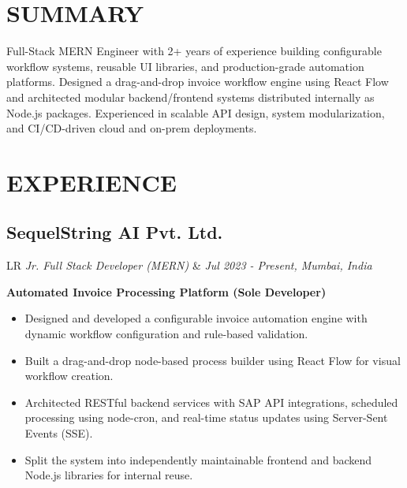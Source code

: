 \documentclass[10pt,a4paper]{moderncv}
\newcommand*{\experienceentry}[4]{
    \subsection{#1}
    \begin{tabularx}{\textwidth}{LR}
        {\itshape #2} & {\itshape #3, #4}
    \end{tabularx}
    \vspace{0.5mm}
}
\begin{document}
\maketitle



\section{SUMMARY}
Full-Stack MERN Engineer with 2+ years of experience building configurable workflow systems, reusable UI libraries, and production-grade automation platforms. Designed a drag-and-drop invoice workflow engine using React Flow and architected modular backend/frontend systems distributed internally as Node.js packages. Experienced in scalable API design, system modularization, and CI/CD-driven cloud and on-prem deployments.

\section{EXPERIENCE}

\experienceentry
{SequelString AI Pvt. Ltd.}
{Jr. Full Stack Developer (MERN)}
{Jul 2023 - Present}
{Mumbai, India}

\textbf{Automated Invoice Processing Platform (Sole Developer)}
\begin{itemize}
    \item Designed and developed a configurable invoice automation engine with dynamic workflow configuration and rule-based validation.
    \item Built a drag-and-drop node-based process builder using React Flow for visual workflow creation.
    \item Architected RESTful backend services with SAP API integrations, scheduled processing using node-cron, and real-time status updates using Server-Sent Events (SSE).
    \item Split the system into independently maintainable frontend and backend Node.js libraries for internal reuse.
\end{itemize}
\end{document}
